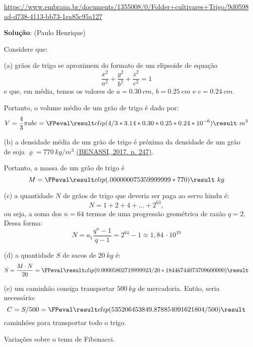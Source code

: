 {
\def\atrigo{0.30}%
\def\btrigo{0.25}%
\def\ctrigo{0.24}%

\url{https://www.embrapa.br/documents/1355008/0/Folder+cultivares+Trigo/9d0598ad-d738-4113-bb73-1ea85c95a127}

\color{red}
\textbf{Solução}: (Paulo Henrique)

Considere que:

(a) grãos de trigo se aproximem do formato de um elipsoide de equação
\[\dfrac{x^2}{a^2} + \dfrac{y^2}{b^2} + \dfrac{z^2}{c^2} = 1\]
e que, em média, temos os valores de \(a = \atrigo\ cm\), \(b = \btrigo\ cm\) e \(c = \ctrigo\ cm\).

Portanto, o volume médio de um grão de trigo é dado por:
\[V = \dfrac{4}{3}\pi abc = \ca{4/3*3.14*\atrigo*\btrigo*\ctrigo*10^{-6}}\ m^3\]
\def\vtrigo{.000000075359999999} %
\def\dtrigo{770} %

(b) a densidade média de um grão de trigo é próxima da densidade de um grão de soja \(\varrho = 770\ kg/m^3\) \href{https://ainfo.cnptia.embrapa.br/digital/bitstream/item/161751/1/246.pdf}{(BENASSI, 2017. p. 247)}. %

Portanto, a massa de um grão de trigo é
\[M = \ca{\vtrigo*\dtrigo}\ kg\]
\def\mtrigo{0.00005802719999923}

(c) a quantidade \(N\) de grãos de trigo que deveria ser paga ao servo hindu é:
\[N = 1+2+4+\ldots+2^{63},\]
ou seja, a soma dos \(n = 64\) termos de uma progressão geométrica de razão \(q = 2\). Dessa forma:
\[
N
= a_1 \dfrac{q^n-1}{q-1}
= 2^{64}-1 \approx 1,84\ \cdot 10^{19}
\]

\def\ntrigo{18446744073709600000}
(d) a quantidade \(S\) de sacos de \(20\ kg\) é:
\[S = \dfrac{M \cdot N}{20} = \ca{\mtrigo/20*\ntrigo}\]
\def\strigo{535206453849.878854091621804}

\def\kcaminhao{500}
(e) um caminhão consiga transportar \(\kcaminhao\ kg\) de mercadoria. Então, seria necessário:
\[C = S/500 = \ca{\strigo/\kcaminhao}\]
caminhões para transportar todo o trigo.
}




\begin{exercise}
Variações sobre o tema de Fibonacci.
\end{exercise}

